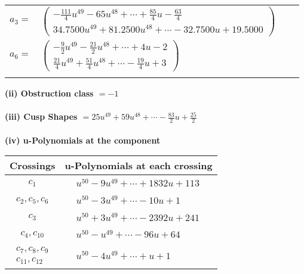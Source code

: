 \documentclass[1p]{elsarticle_modified}
\theoremstyle{definition}
\begin{document}
\begin{tabular}{m{7pt} m{180pt} m{7pt} m{180pt} }
\flushright $a_{3}=$&$\begin{pmatrix}-\frac{111}{4} u^{49}-65 u^{48}+\cdots+\frac{85}{4} u-\frac{63}{4}\\34.7500 u^{49}+81.2500 u^{48}+\cdots-32.7500 u+19.5000\end{pmatrix}$ \\
\flushright $a_{6}=$&$\begin{pmatrix}-\frac{9}{2} u^{49}-\frac{21}{2} u^{48}+\cdots+4 u-2\\\frac{21}{4} u^{49}+\frac{51}{4} u^{48}+\cdots-\frac{19}{4} u+3\end{pmatrix}$\\&\end{tabular}
\flushleft \textbf{(ii) Obstruction class $= -1$}\\~\\
\flushleft \textbf{(iii) Cusp Shapes $= 25 u^{49}+59 u^{48}+\cdots-\frac{83}{2} u+\frac{25}{2}$}\\~\\
\newpage\renewcommand{\arraystretch}{1}
\flushleft \textbf{(iv) u-Polynomials at the component}\newline \\
\begin{tabular}{m{50pt}|m{274pt}}
Crossings & \hspace{64pt}u-Polynomials at each crossing \\
\hline $$\begin{aligned}c_{1}\end{aligned}$$&$\begin{aligned}
&u^{50}-9 u^{49}+\cdots+1832 u+113
\end{aligned}$\\
\hline $$\begin{aligned}c_{2},c_{5},c_{6}\end{aligned}$$&$\begin{aligned}
&u^{50}-3 u^{49}+\cdots-10 u+1
\end{aligned}$\\
\hline $$\begin{aligned}c_{3}\end{aligned}$$&$\begin{aligned}
&u^{50}+3 u^{49}+\cdots-2392 u+241
\end{aligned}$\\
\hline $$\begin{aligned}c_{4},c_{10}\end{aligned}$$&$\begin{aligned}
&u^{50}- u^{49}+\cdots-96 u+64
\end{aligned}$\\
\hline $$\begin{aligned}c_{7},c_{8},c_{9}\\c_{11},c_{12}\end{aligned}$$&$\begin{aligned}
&u^{50}-4 u^{49}+\cdots+u+1
\end{aligned}$\\
\hline
\end{tabular}\\~\\
\end{document}
